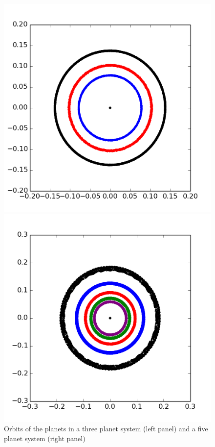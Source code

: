 \documentclass[12pt]{report}
\begin{document}
\begin{figure}
\centering
\begin{minipage}{.5\textwidth}
  \centering
  \includegraphics[width=1\linewidth]{img/180.png}
 

\end{minipage}%
\begin{minipage}{.5\textwidth}
  \centering
  \includegraphics[width=1\linewidth]{img/320.png}
  

\end{minipage}
\caption{Orbits of the planets in a three planet system (left panel) and a five planet system (right panel)}
\label{fig:stability_sim}
\end{figure}
\end{document}
